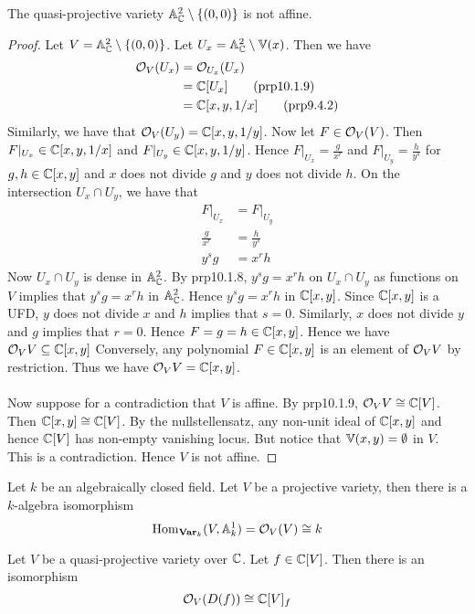 \documentclass[a4paper]{article}
\begin{document}
\begin{eg}{}{} The quasi-projective variety $\mathbb{A}_{\mathbb{C}}^2\setminus\{(0,0)\}$ is not affine. \tcbline
\begin{proof}
Let $V=\mathbb{A}_{\mathbb{C}}^2\setminus\{(0,0)\}$. Let $U_x=\mathbb{A}_{\mathbb{C}}^2\setminus\mathbb{V}(x)$. Then we have 
\begin{align*}
\mathcal{O}_V(U_x)&=\mathcal{O}_{U_x}(U_x)\\
&=\mathbb{C}[U_x]\tag{prp10.1.9}\\
&=\mathbb{C}[x,y,1/x]\tag{prp9.4.2}
\end{align*}
Similarly, we have that $\mathcal{O}_V(U_y)=\mathbb{C}[x,y,1/y]$. Now let $F\in\mathcal{O}_V(V)$. Then $F|_{U_x}\in\mathbb{C}[x,y,1/x]$ and $F|_{U_y}\in\mathbb{C}[x,y,1/y]$. Hence $F|_{U_x}=\frac{g}{x^r}$ and $F|_{U_y}=\frac{h}{y^s}$ for $g,h\in\mathbb{C}[x,y]$ and $x$ does not divide $g$ and $y$ does not divide $h$. On the intersection $U_x\cap U_y$, we have that 
\begin{align*}
F|_{U_x}&=F|_{U_y}\\
\frac{g}{x^r}&=\frac{h}{y^s}\\
y^sg&=x^rh
\end{align*}
Now $U_x\cap U_y$ is dense in $\mathbb{A}_{\mathbb{C}}^2$. By prp10.1.8, $y^sg=x^rh$ on $U_x\cap U_y$ as functions on $V$ implies that $y^sg=x^rh$ in $\mathbb{A}_{\mathbb{C}}^2$. Hence $y^sg=x^rh$ in $\mathbb{C}[x,y]$. Since $\mathbb{C}[x,y]$ is a UFD, $y$ does not divide $x$ and $h$ implies that $s=0$. Similarly, $x$ does not divide $y$ and $g$ implies that $r=0$. Hence $F=g=h\in\mathbb{C}[x,y]$. Hence we have $\mathcal{O}_VV\subseteq\mathbb{C}[x,y]$ Conversely, any polynomial $F\in\mathbb{C}[x,y]$ is an element of $\mathcal{O}_VV$ by restriction. Thus we have $\mathcal{O}_VV=\mathbb{C}[x,y]$. \\~\\

Now suppose for a contradiction that $V$ is affine. By prp10.1.9, $\mathcal{O}_VV\cong\mathbb{C}[V]$. Then $\mathbb{C}[x,y]\cong\mathbb{C}[V]$. By the nullstellensatz, any non-unit ideal of $\mathbb{C}[x,y]$ and hence $\mathbb{C}[V]$ has non-empty vanishing locus. But notice that $\mathbb{V}(x,y)=\emptyset$ in $V$. This is a contradiction. Hence $V$ is not affine. 
\end{proof}
\end{eg}

\begin{prp}{}{} Let $k$ be an algebraically closed field. Let $V$ be a projective variety, then there is a $k$-algebra isomorphism $$\operatorname{Hom}_{\bold{Var}_k}(V,\mathbb{A}_k^1)=\mathcal{O}_V(V)\cong k$$
\end{prp}

\begin{prp}{}{} Let $V$ be a quasi-projective variety over $\mathbb{C}$. Let $f\in\mathbb{C}[V]$. Then there is an isomorphism $$\mathcal{O}_V(D(f))\cong\mathbb{C}[V]_f$$
\end{prp}
\end{document}
